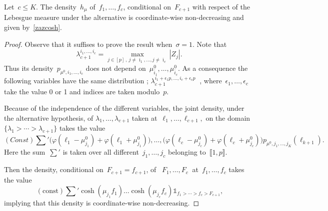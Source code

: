 \documentclass[final,numbib]{imaiai}%
\numberwithin{equation}{section}
\def\eq{\begin{equation}}
\def\qe{\end{equation}}
\renewcommand{\bar}{\overline}
\newcommand{\<}{\langle}
\renewcommand{\>}{\rangle}
\newcommand{\1}{\mathds{1}}
\begin{document}
{ \begin{lemma} \label{z:l:1}
  Let~$c \leq K$.  The density~$h_\mu$ of~$f_1, \ldots, f_c$, conditional on~$F_{c+1}$ with respect of the Lebesgue measure  under the alternative is  coordinate-wise  non-decreasing and given by~\eqref{zazcosh}.
  \end{lemma}
  \begin{proof}
Observe that it suffises to prove the result when~$\sigma=1$. Note that 
~$$
 \lambda_{c+1}^{i_1, \dots, i_c } =   \max_{j\in[p]\,,\   j\neq \bar \imath_1,\ldots,   j \neq  \bar \imath_c}  |Z_j|.
~$$
  Thus its density~$ p_{\mu^0,i_1,\ldots,i_c}$ does not depend  on~$\mu^0_{ \bar i_1},\ldots,\mu^0_{ \bar i_c}$. As a consequence the following variables have the same distribution ;
$ \lambda_{c+1}^{i_1 +\epsilon_1 p, \dots, i_c +\epsilon_c p}~$ , where~$\epsilon_1,\ldots,\epsilon_c$ take the value 0 or 1 and  indices are taken modulo~$p$. 



Because of the independence of the different variables, the joint density, under the alternative hypothesis, of $\lambda_1, \ldots,  \lambda_{c+1}$ taken at~$ \ell_1, \ldots, \ell_{c+1},$  on the domain~$ \{\lambda_1>\cdots > \lambda_{c+1}\}$ takes the value
~$$
 (Const)   \sum'   \big(\varphi(\ell_1 -\mu^0_{j_1} ) +\varphi(\ell_1 +\mu^0_{j_1} ) \big),\ldots ,
   \big(\varphi(\ell_c -\mu^0_{j_c} ) +\varphi(\ell_c +\mu^0_{j_c} ) \big)
  p_{\mu^0,j_1,\ldots,j_K}(\ell_{k+1}).
~$$
Here the sum~$ \displaystyle \sum'$ is taken over all different~$j_1, \ldots, j_c$ belonging  to~$\llbracket 1, p\rrbracket$.
 
 Then the density, conditional on~$F_{c+1} = f_{c+1}$,   of
~$ F_1 ,\ldots,F_{c}~$  at~$f_1,\ldots,f_c$  takes the value
~
\eq
\label{zazcosh}
 \mathrm{(const)}  \sum'  \cosh( \mu_{j_1} f_1)\ldots \cosh( \mu_{j_c} f_c) \1_{f_1>\cdots> f_{c}> F_{c+1}},
\qe
 implying  that this density is coordinate-wise  non-decreasing. 
 \end{proof}
 
}
\end{document}
